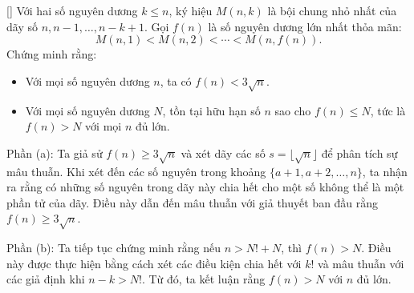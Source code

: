 \documentclass[../03-arithmetic-functions.tex]{subfiles}
\begin{document}
\begin{example*}\label{example:ROU-2015-TST-D3-P3}[\textbf{}]
    Với hai số nguyên dương \( k \leq n \), ký hiệu \( M(n,k) \) là bội chung nhỏ nhất của dãy số \( n, n-1, \dots, n - k + 1 \).  
    Gọi \( f(n) \) là số nguyên dương lớn nhất thỏa mãn:
    \[
        M(n,1) < M(n,2) < \cdots < M(n,f(n)).
    \]
    Chứng minh rằng:
    \begin{itemize}[topsep=0pt, partopsep=0pt, itemsep=0pt]
        \item Với mọi số nguyên dương \( n \), ta có \( f(n) < 3\sqrt{n} \).
        \item Với mọi số nguyên dương \( N \), tồn tại hữu hạn số \( n \) sao cho \( f(n) \leq N \), tức là \( f(n) > N \) với mọi \( n \) đủ lớn.
    \end{itemize}    
\end{example*}

\begin{story*}
    Phần (a): Ta giả sử \( f(n) \ge 3\sqrt{n} \) và xét dãy các số \( s = \lfloor \sqrt{n} \rfloor \) để phân tích sự mâu thuẫn. Khi xét đến các số nguyên trong khoảng \( \{a+1, a+2, \dots, n\} \), ta nhận ra rằng có những số nguyên trong dãy này chia hết cho một số không thể là một phần tử của dãy. Điều này dẫn đến mâu thuẫn với giả thuyết ban đầu rằng \( f(n) \ge 3\sqrt{n} \).  
    
    Phần (b): Ta tiếp tục chứng minh rằng nếu \( n > N! + N \), thì \( f(n) > N \). Điều này được thực hiện bằng cách xét các điều kiện chia hết với \( k! \) và mâu thuẫn với các giả định khi \( n - k > N! \).  
    Từ đó, ta kết luận rằng \( f(n) > N \) với \( n \) đủ lớn.
\end{story*}

\bigbreak
\end{document}
